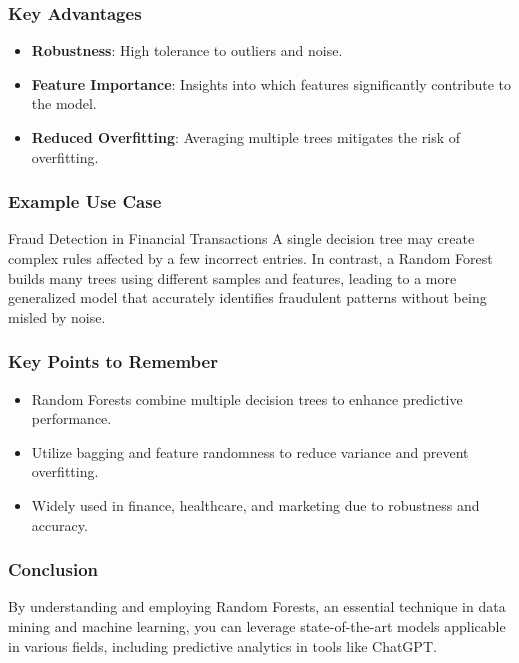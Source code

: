 \documentclass[aspectratio=169]{beamer}
\begin{document}
\begin{frame}[fragile]
    \frametitle{Key Advantages}
    \begin{itemize}
        \item \textbf{Robustness}: High tolerance to outliers and noise.
        \item \textbf{Feature Importance}: Insights into which features significantly contribute to the model.
        \item \textbf{Reduced Overfitting}: Averaging multiple trees mitigates the risk of overfitting.
    \end{itemize}
\end{frame}

\begin{frame}[fragile]
    \frametitle{Example Use Case}
    \begin{block}{Fraud Detection in Financial Transactions}
        A single decision tree may create complex rules affected by a few incorrect entries. In contrast, a Random Forest builds many trees using different samples and features, leading to a more generalized model that accurately identifies fraudulent patterns without being misled by noise.
    \end{block}
\end{frame}

\begin{frame}[fragile]
    \frametitle{Key Points to Remember}
    \begin{itemize}
        \item Random Forests combine multiple decision trees to enhance predictive performance.
        \item Utilize bagging and feature randomness to reduce variance and prevent overfitting.
        \item Widely used in finance, healthcare, and marketing due to robustness and accuracy.
    \end{itemize}
\end{frame}

\begin{frame}[fragile]
    \frametitle{Conclusion}
    By understanding and employing Random Forests, an essential technique in data mining and machine learning, you can leverage state-of-the-art models applicable in various fields, including predictive analytics in tools like ChatGPT.
\end{frame}
\end{document}
